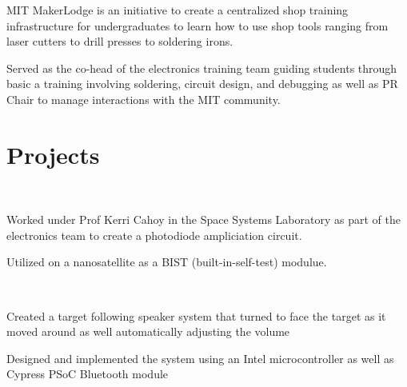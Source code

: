 \documentclass[letterpaper, article]{deedy-resume-openfont}
\begin{document}
\begin{minipage}[t]{0.66\textwidth}

\begin{tightemize}
	\item MIT MakerLodge is an initiative to create a centralized shop training infrastructure for undergraduates to learn how to use shop tools ranging from laser cutters to drill presses to soldering irons.
	\item Served as the co-head of the electronics training team guiding students through basic a training involving soldering, circuit design, and debugging as well as PR Chair to manage interactions with the MIT community.
\end{tightemize}


\section{Projects}
\\
\begin{tightemize}
	\item Worked under Prof Kerri Cahoy in the Space Systems Laboratory as part of the electronics team to create a photodiode ampliciation circuit.
	\item Utilized on a nanosatellite as a BIST (built-in-self-test) modulue.
\end{tightemize}

\\
\begin{tightemize}
	\item Created a target following speaker system that turned to face the target as it moved around as well automatically adjusting the volume
	\item Designed and implemented the system using an Intel microcontroller as well as Cypress PSoC Bluetooth module
\end{tightemize}


\end{minipage}
\end{document}
